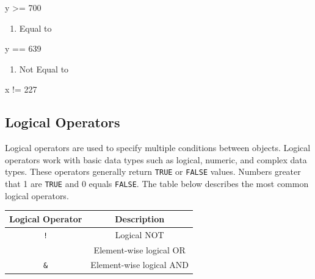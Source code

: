 \documentclass[
  letterpaper,
  DIV=11,
  numbers=noendperiod]{scrreprt}
\newenvironment{Shaded}{}{}
\newcommand{\DecValTok}[1]{\textcolor[rgb]{0.00,0.36,0.77}{#1}}
\newcommand{\NormalTok}[1]{\textcolor[rgb]{0.14,0.16,0.18}{#1}}
\newcommand{\SpecialCharTok}[1]{\textcolor[rgb]{0.00,0.36,0.77}{#1}}
\providecommand{\tightlist}{%
  \setlength{\itemsep}{0pt}\setlength{\parskip}{0pt}}\usepackage{longtable,booktabs,array}
\begin{document}
\begin{Shaded}
\begin{Highlighting}[]
\NormalTok{y }\SpecialCharTok{\textgreater{}=} \DecValTok{700}
\end{Highlighting}
\end{Shaded}

\begin{enumerate}
\def\labelenumi{\alph{enumi}.}
\setcounter{enumi}{4}
\tightlist
\item
  Equal to
\end{enumerate}

\begin{Shaded}
\begin{Highlighting}[]
\NormalTok{y }\SpecialCharTok{==} \DecValTok{639}
\end{Highlighting}
\end{Shaded}

\begin{enumerate}
\def\labelenumi{\alph{enumi}.}
\setcounter{enumi}{5}
\tightlist
\item
  Not Equal to
\end{enumerate}

\begin{Shaded}
\begin{Highlighting}[]
\NormalTok{x }\SpecialCharTok{!=} \DecValTok{227}
\end{Highlighting}
\end{Shaded}

\subsection{Logical Operators}\label{logical-operators}

Logical operators are used to specify multiple conditions between
objects. Logical operators work with basic data types such as logical,
numeric, and complex data types. These operators generally return
\texttt{TRUE} or \texttt{FALSE} values. Numbers greater that 1 are
\texttt{TRUE} and 0 equals \texttt{FALSE}. The table below describes the
most common logical operators.

\begin{longtable}[]{@{}cc@{}}
\toprule\noalign{}
Logical Operator & Description \\
\midrule\noalign{}
\endhead
\bottomrule\noalign{}
\endlastfoot
\texttt{!} & Logical NOT \\
\texttt{\textbar{}} & Element-wise logical OR \\
\texttt{\&} & Element-wise logical AND \\
\end{longtable}
\end{document}
